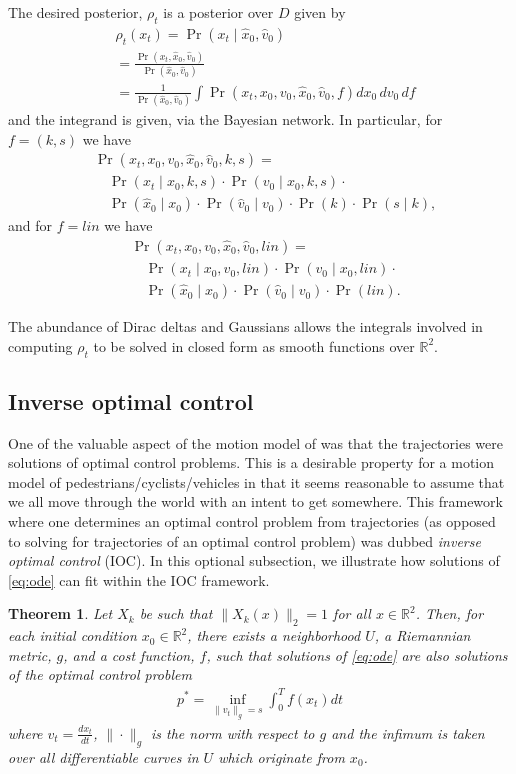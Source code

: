 \documentclass[conference]{IEEEtran}
\newtheorem{thm}{Theorem}
\begin{document}
The desired posterior, $\rho_t$ is a posterior over $D$ given by
\begin{align*}
	&\rho_t(x_t) = \Pr(x_t \mid \hat{x}_0, \hat{v}_0) \\
		&= \frac{ \Pr( x_t, \hat{x}_0, \hat{v}_0) }{ \Pr( \hat{x}_0, \hat{v}_0 ) } \\
		&= \frac{1}{ \Pr( \hat{x}_0, \hat{v}_0 ) } \int \Pr( x_t , x_0, v_0, \hat{x}_0, \hat{v}_0 , f ) dx_0\, dv_0\, df
\end{align*}
and the integrand is given, via the Bayesian network.
In particular, for $f = (k,s)$ we have
\begin{align*}
	 &\Pr( x_t , x_0, v_0, \hat{x}_0, \hat{v}_0 , k,s) =\\
	 &\quad \Pr( x_t \mid x_0 , k, s) \cdot \Pr( v_0 \mid x_0, k , s ) \cdot \\
	 &\quad \Pr( \hat{x}_0 \mid x_0 ) \cdot \Pr( \hat{v}_0 \mid v_0 ) \cdot \Pr(k) \cdot \Pr(s \mid k),
\end{align*}
and for $f = lin$ we have
\begin{align*}
	 &\Pr( x_t , x_0, v_0, \hat{x}_0, \hat{v}_0 , lin) =\\
	 &\quad \Pr( x_t \mid x_0 , v_0, lin) \cdot \Pr( v_0 \mid x_0, lin ) \cdot \\
	 &\quad \Pr( \hat{x}_0 \mid x_0 ) \cdot \Pr( \hat{v}_0 \mid v_0 ) \cdot \Pr(lin).
\end{align*}

The abundance of Dirac deltas and Gaussians allows the integrals involved in computing $\rho_t$ to be solved in closed form
as smooth functions over $\mathbb{R}^2$.

\subsection{Inverse optimal control}
One of the valuable aspect of the motion model of \cite{Kitani2012} was that the trajectories were solutions of optimal control problems.
This is a desirable property for a motion model of pedestrians/cyclists/vehicles in that it seems reasonable to assume that we all move through the world with an intent to get somewhere.
This framework where one determines an optimal control problem from trajectories (as opposed to solving for trajectories of an optimal control problem) was dubbed \emph{inverse optimal control} (IOC).
In this optional subsection, we illustrate how solutions of \ref{eq:ode} can fit within the IOC framework.

\begin{thm}
	Let $X_k$ be such that $\| X_k(x) \|_2 = 1$ for all $x \in \mathbb{R}^2$.
Then, for each initial condition $x_0 \in \mathbb{R}^2$, there exists a neighborhood $U$, a Riemannian metric, $g$, and a cost function, $f$, 
such that solutions of \eqref{eq:ode} are also solutions of the optimal control problem
\begin{align}
	p^* = \inf_{ \| v_t \|_g = s } \int_0^T f( x_t) dt \label{eq:IOC}
\end{align}
where $v_t = \frac{d x_t}{dt}$, $\| \cdot \|_g$ is the norm with respect to $g$ and the infimum is taken over all differentiable curves in $U$ which originate from $x_0$.
\end{thm}
\end{document}
